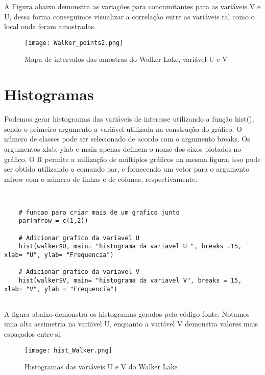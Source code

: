 A Figura abaixo demonstra as variações para concumitantes para as variáveis V e U, dessa forma conseguimos visualizar a correlaçào entre as variáveis tal como o local onde foram amostradas. 

\FloatBarrier
 \begin{figure}[H]
	\centering
	\texttt{[image: Walker\_points2.png]}	
	\caption{Mapa de intervalos das amostras do Walker Lake, variável U e V}
	\label{walk}
\end{figure}
\FloatBarrier


\section{Histogramas} 

Podemos gerar histogramas das variáveis de interesse utilizando a função hist(), sendo o primeiro argumento a variável utilizada na construção do gráfico. O número de classes pode ser selecionado de acordo com o argumento breaks. Os argumentos xlab, ylab e main apenas definem o nome dos eixos plotados no gráfico. O R permite a utilização de múltiplos gráficos na mesma figura, isso pode ser obtido utilizando o comando par, e fornecendo um vetor para o argumento mfrow com o número de linhas e de colunas, respectivamente.

\begin{scriptsize}
	\estiloR
	\begin{lstlisting}[caption={Criação de um vetor em R}, label=lst:rcode]
	
	
	# funcao para criar mais de um grafico junto 
	par(mfrow = c(1,2))
	
	# Adicionar grafico da variavel U
	hist(walker$U, main= "histograma da variavel U ", breaks =15, xlab= "U", ylab= "Frequencia")
	
	# Adicionar grafico da variavel V
	hist(walker$V, main= "histograma da variavel V", breaks = 15,  xlab= "V", ylab = "Frequencia")
	
	\end{lstlisting}
\end{scriptsize}

A figura abaixo demonstra os histogramas gerados pelo código fonte. Notamos uma alta assimetria na variável U, enquanto a variável V demonstra valores mais espaçados entre si. 

\FloatBarrier
\begin{figure}[h]
	\centering
	\texttt{[image: hist\_Walker.png]}	
	\caption{Histogramas das variáveis U e V do Walker Lake}
	\label{walk}
\end{figure}
\FloatBarrier


